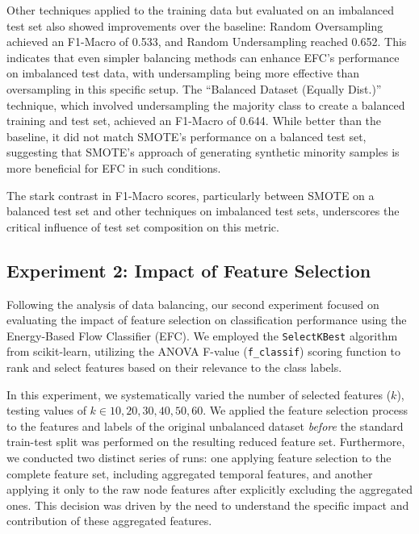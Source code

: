 \documentclass[12pt]{article}
\begin{document}
Other techniques applied to the training data but evaluated on an imbalanced test set
also showed improvements over the baseline: Random Oversampling achieved an F1-Macro of 0.533, and Random Undersampling
reached 0.652. This indicates that even simpler balancing methods can enhance EFC's performance on imbalanced test data,
with undersampling being more effective than oversampling in this specific setup. The ``Balanced Dataset (Equally Dist.)''
technique, which involved undersampling the majority class to create a balanced training and test set, achieved an F1-Macro
of 0.644. While better than the baseline, it did not match SMOTE's performance on a balanced test set, suggesting that
SMOTE's approach of generating synthetic minority samples is more beneficial for EFC in such conditions. 

The stark contrast in F1-Macro scores, particularly between SMOTE on a balanced test set and other techniques on imbalanced
test sets, underscores the critical influence of test set composition on this metric.

\subsection{Experiment 2: Impact of Feature Selection} \label{subsec:experiment_2}

Following the analysis of data balancing, our second experiment focused on evaluating the impact of feature selection on
classification performance using the Energy-Based Flow Classifier (EFC). We employed the \texttt{SelectKBest} algorithm
from scikit-learn, utilizing the ANOVA F-value (\texttt{f\_classif}) scoring function to rank and select features based
on their relevance to the class labels. 

In this experiment, we systematically varied the number of selected features ($k$), testing values of $k \in {10, 20, 30,
40, 50, 60}$. We applied the feature selection process to the features and labels of the original unbalanced dataset
\textit{before} the standard train-test split was performed on the resulting reduced feature set. Furthermore, we conducted
two distinct series of runs: one applying feature selection to the complete feature set, including aggregated temporal
features, and another applying it only to the raw node features after explicitly excluding the aggregated ones. This
decision was driven by the need to understand the specific impact and contribution of these aggregated features. 
\end{document}
